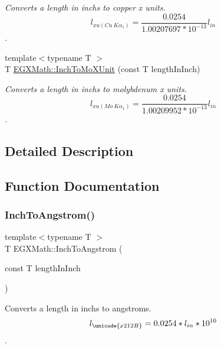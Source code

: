 \begin{DoxyCompactItemize}
\begin{DoxyCompactList}\small\item\em Converts a length in inchs to copper x units. \[ l_{xu(Cu\ K\alpha_1)}=\frac{0.0254}{1.00207697*10^{-13}} l_{in}\]. \end{DoxyCompactList}\item 
{\footnotesize template$<$typename T $>$ }\\T \mbox{\hyperlink{group___e_g_x_math-_conversions-_length_conversions-_imperial-_inch-_non-_s_i_ga938a029b99c57c1b765ebf23e82dee6e}{E\+G\+X\+Math\+::\+Inch\+To\+Mo\+X\+Unit}} (const T length\+In\+Inch)
\begin{DoxyCompactList}\small\item\em Converts a length in inchs to molybdenum x units. \[ l_{xu(Mo\ K\alpha_1)}=\frac{0.0254}{1.00209952*10^{-13}} l_{in}\]. \end{DoxyCompactList}\end{DoxyCompactItemize}


\subsection{Detailed Description}


\subsection{Function Documentation}
\mbox{\label{group___e_g_x_math-_conversions-_length_conversions-_imperial-_inch-_non-_s_i_ga37c2030e31292fe77b024bffaf4c7f9b}} 
\subsubsection{\texorpdfstring{Inch\+To\+Angstrom()}{InchToAngstrom()}}
{\footnotesize\ttfamily template$<$typename T $>$ \\
T E\+G\+X\+Math\+::\+Inch\+To\+Angstrom (\begin{DoxyParamCaption}\item[{const T}]{length\+In\+Inch }\end{DoxyParamCaption})}



Converts a length in inchs to angstroms. \[ l_{\unicode{x212B}}=0.0254 * l_{in} * 10^{10} \]. 

